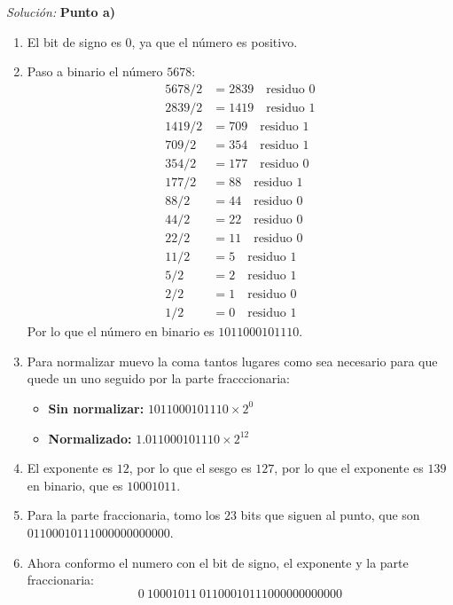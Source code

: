 \documentclass{article}
\newenvironment{solution}
    {\textit{Solución:}}
    {}
\begin{document}
\begin{solution}
\textbf{Punto a)}
\begin{enumerate}
    \item El bit de signo es $0$, ya que el número es positivo.
    \item Paso a binario el número $5678$:
    \begin{align*}
        5678/2 &= 2839 \quad \text{residuo } 0\\
        2839/2 &= 1419 \quad \text{residuo } 1\\
        1419/2 &= 709 \quad \text{residuo } 1\\
        709/2 &= 354 \quad \text{residuo } 1\\
        354/2 &= 177 \quad \text{residuo } 0\\
        177/2 &= 88 \quad \text{residuo } 1\\
        88/2 &= 44 \quad \text{residuo } 0\\
        44/2 &= 22 \quad \text{residuo } 0\\
        22/2 &= 11 \quad \text{residuo } 0\\
        11/2 &= 5 \quad \text{residuo } 1\\
        5/2 &= 2 \quad \text{residuo } 1\\
        2/2 &= 1 \quad \text{residuo } 0\\
        1/2 &= 0 \quad \text{residuo } 1
    \end{align*}
    Por lo que el número en binario es $1011000101110$. 
    \item Para normalizar muevo la coma tantos lugares como sea necesario para que quede un uno seguido por la parte fracccionaria:
    \begin{itemize}
        \item \textbf{Sin normalizar:} $1011000101110 \times 2^0$
        \item \textbf{Normalizado:} $1.011000101110 \times 2^{12}$
    \end{itemize}
    \item El exponente es $12$, por lo que el sesgo es $127$, por lo que el exponente es $139$ en binario, que es $10001011$.
    \item Para la parte fraccionaria, tomo los $23$ bits que siguen al punto, que son $01100010111000000000000$.
    \item Ahora conformo el numero con el bit de signo, el exponente y la parte fraccionaria:
    \begin{equation*}
        0 \ 10001011 \ 01100010111000000000000
    \end{equation*}
\end{enumerate}


\end{solution}
\end{document}
